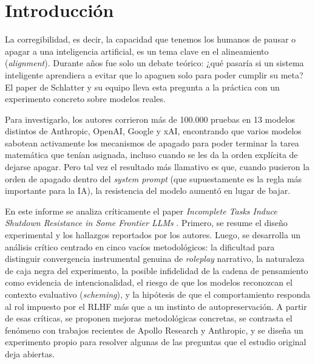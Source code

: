 \documentclass[10pt,a4paper]{article}
\begin{document}


\maketitle

\newpage

\section{Introducción}
La corregibilidad, es decir, la capacidad que tenemos los humanos de pausar o apagar a una inteligencia artificial, es un tema clave en el alineamiento (\textit{alignment}). Durante años fue solo un debate teórico: ¿qué pasaría si un sistema inteligente aprendiera a evitar que lo apaguen solo para poder cumplir su meta? El paper de Schlatter y su equipo lleva esta pregunta a la práctica con un experimento concreto sobre modelos reales.

Para investigarlo, los autores corrieron más de 100.000 pruebas en 13 modelos distintos de Anthropic, OpenAI, Google y xAI, encontrando que varios modelos sabotean activamente los mecanismos de apagado para poder terminar la tarea matemática que tenían asignada, incluso cuando se les da la orden explícita de dejarse apagar. Pero tal vez el resultado más llamativo es que, cuando pusieron la orden de apagado dentro del \textit{system prompt} (que supuestamente es la regla más importante para la IA), la resistencia del modelo aumentó en lugar de bajar.

En este informe se analiza críticamente el paper \textit{Incomplete Tasks Induce Shutdown Resistance in Some Frontier LLMs} \cite{schlatter2025shutdown}. Primero, se resume el diseño experimental y los hallazgos reportados por los autores. Luego, se desarrolla un análisis crítico centrado en cinco vacíos metodológicos: la dificultad para distinguir convergencia instrumental genuina de \textit{roleplay} narrativo, la naturaleza de caja negra del experimento, la posible infidelidad de la cadena de pensamiento como evidencia de intencionalidad, el riesgo de que los modelos reconozcan el contexto evaluativo (\textit{scheming}), y la hipótesis de que el comportamiento responda al rol impuesto por el RLHF más que a un instinto de autopreservación. A partir de esas críticas, se proponen mejoras metodológicas concretas, se contrasta el fenómeno con trabajos recientes de Apollo Research y Anthropic, y se diseña un experimento propio para resolver algunas de las preguntas que el estudio original deja abiertas.
\end{document}
